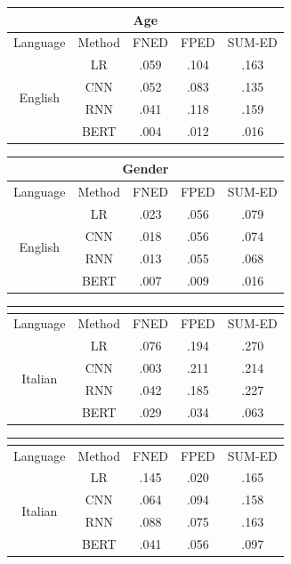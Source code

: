 \begin{table}[htp]
\centering
\footnotesize
\begin{tabular}{cc|ccc}
\multicolumn{5}{c}{\textbf{Age}} \\\hline\hline
Language & Method & FNED & FPED & SUM-ED\\\hline
\multirow{4}{*}{English} & LR & .059 & .104 & .163\\
 & CNN  & .052 & .083 & .135 \\
 & RNN  & .041 & .118 & .159 \\
 & BERT & .004 & .012 & .016 
\end{tabular}
\quad
\begin{tabular}{cc|ccc}
\multicolumn{5}{c}{\textbf{Gender}} \\\hline\hline
Language & Method & FNED & FPED & SUM-ED \\\hline
\multirow{4}{*}{English} & LR & .023 & .056 & .079 \\
 & CNN  & .018 & .056 & .074 \\
 & RNN  & .013 & .055 & .068 \\
 & BERT & .007 & .009 & .016
\end{tabular}

\begin{tabular}{cc|ccc}
\multicolumn{5}{c}{} \\\hline\hline
Language & Method & FNED & FPED & SUM-ED \\\hline
\multirow{4}{*}{Italian} & LR & .076 & .194 & .270\\
 & CNN  & .003 & .211 & .214\\
 & RNN  & .042 & .185 & .227\\
 & BERT & .029 & .034 & .063
\end{tabular}
\quad
\begin{tabular}{cc|ccc}
\multicolumn{5}{c}{} \\\hline\hline
Language & Method & FNED & FPED & SUM-ED \\\hline
\multirow{4}{*}{Italian} & LR  & .145 & .020 & .165 \\
 & CNN  & .064 & .094 & .158 \\
 & RNN  & .088 & .075 & .163 \\
 & BERT & .041 & .056 & .097
\end{tabular}


\end{table}
